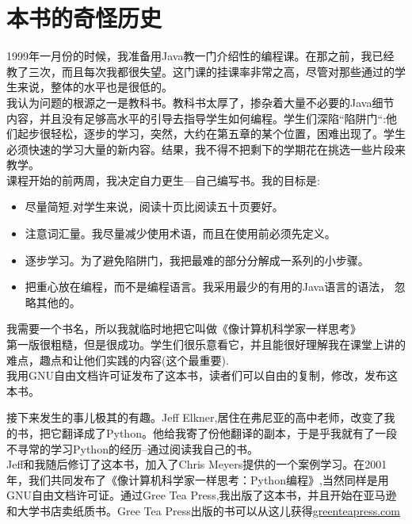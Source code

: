 \section{本书的奇怪历史}

1999年一月份的时候，我准备用Java教一门介绍性的编程课。在那之前，我已经
教了三次，而且每次我都很失望。这门课的挂课率非常之高，尽管对那些通过的学
生来说，整体的水平也是很低的。\\

我认为问题的根源之一是教科书。教科书太厚了，掺杂着大量不必要的Java细节
内容，并且没有足够高水平的引导去指导学生如何编程。学生们深陷“陷阱门“:他们起步很轻松，逐步的学习，突然，大约在第五章的某个位置，困难出现了。学生必须快速的学习大量的新内容。结果，我不得不把剩下的学期花在挑选一些片段来教学。\\

课程开始的前两周，我决定自力更生---自己编写书。我的目标是:
\begin{itemize}

\item 尽量简短.对学生来说，阅读十页比阅读五十页要好。

\item 注意词汇量。我尽量减少使用术语，而且在使用前必须先定义。

\item 逐步学习。为了避免陷阱门，我把最难的部分分解成一系列的小步骤。

\item 把重心放在编程，而不是编程语言。我采用最少的有用的Java语言的语法，
忽略其他的。
\end{itemize}

我需要一个书名，所以我就临时地把它叫做《像计算机科学家一样思考》\\

第一版很粗糙，但是很成功。学生们很乐意看它，并且能很好理解我在课堂上讲的难点，趣点和让他们实践的内容(这个最重要).\\

我用GNU自由文档许可证发布了这本书，读者们可以自由的复制，修改，发布这本书。 \\


 接下来发生的事儿极其的有趣。Jeff Elkner,居住在弗尼亚的高中老师，改变了我的书，把它翻译成了Python。他给我寄了份他翻译的副本，于是乎我就有了一段不寻常的学习Python的经历--通过阅读我自己的书。\\

 Jeff和我随后修订了这本书，加入了Chris Meyers提供的一个案例学习。在2001年，我们共同发布了《像计算机科学家一样思考：Python编程》,当然同样是用GNU自由文档许可证。通过Gree Tea Press,我出版了这本书，并且开始在亚马逊和大学书店卖纸质书。Gree Tea Press出版的书可以从这儿获得\url{greenteapress.com}\\

